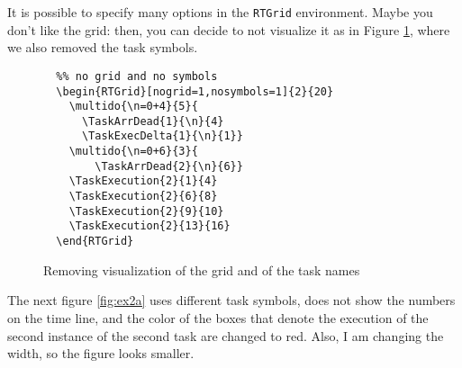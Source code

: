 \documentclass{article}
\begin{document}
It is possible to specify many options in the \texttt{RTGrid}
environment.  Maybe you don't like the grid: then, you can decide to
not visualize it as in Figure \ref{fig:ex2}, where we also removed the
task symbols.
\begin{figure}[h]
  \centering
  \begin{RTGrid}[nogrid=1,nosymbols=1]{2}{20}
  \end{RTGrid}
\begin{verbatim}
  %% no grid and no symbols
  \begin{RTGrid}[nogrid=1,nosymbols=1]{2}{20}
    \multido{\n=0+4}{5}{         
      \TaskArrDead{1}{\n}{4}    
      \TaskExecDelta{1}{\n}{1}}
    \multido{\n=0+6}{3}{         
        \TaskArrDead{2}{\n}{6}}
    \TaskExecution{2}{1}{4}
    \TaskExecution{2}{6}{8}
    \TaskExecution{2}{9}{10}
    \TaskExecution{2}{13}{16}        
  \end{RTGrid}
\end{verbatim}
  \caption{Removing visualization of the grid and of the task names}
  \label{fig:ex2}
\end{figure}

The next figure \ref{fig:ex2a} uses different task symbols, does not
show the numbers on the time line, and the color of the boxes that
denote the execution of the second instance of the second task are
changed to red. Also, I am changing the width, so the figure looks
smaller.
\end{document}
